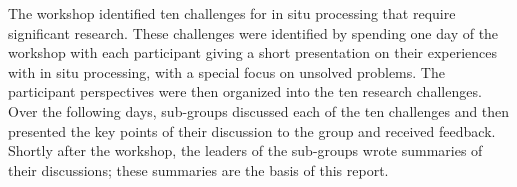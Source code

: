 

The workshop identified ten challenges for in situ processing that require significant research.
%
These challenges were identified by spending one day of the workshop with each participant giving a short
presentation on their experiences with in situ processing, with a special focus on unsolved problems.
%
The participant perspectives were then organized into the ten research challenges.
%
Over the following days, 
 sub-groups  discussed each of the ten challenges and then presented the key points of their discussion to the group and received feedback.
%
Shortly after the workshop, the leaders of the sub-groups wrote summaries of their discussions; these summaries are the basis of this report.

